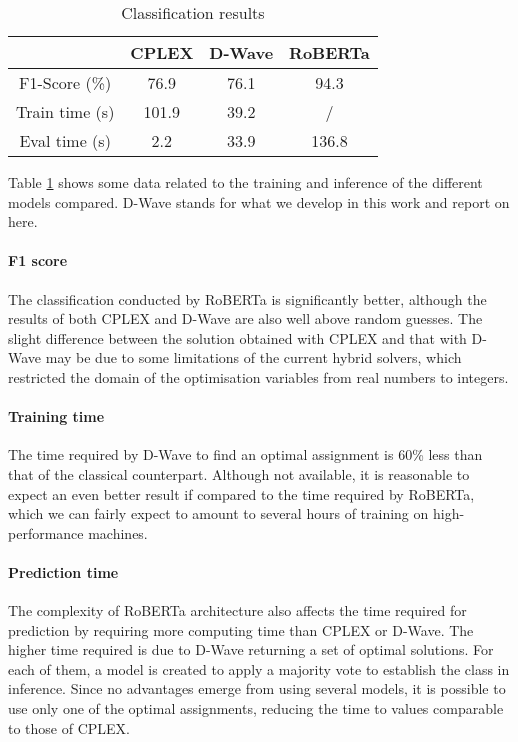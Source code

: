\documentclass{ceurart}
\begin{document}
\begin{table}
    \caption{Classification results}
    \label{tab:classification}
    \begin{tabular}{cccc}
        \toprule
        & CPLEX & D-Wave & RoBERTa \\
        \midrule
        F1-Score (\%) & 76.9 & 76.1 & 94.3 \\
        Train time (s) & 101.9 & 39.2 & / \\
        Eval time (s) & 2.2 & 33.9 & 136.8 \\
        \bottomrule
    \end{tabular}
\end{table}

Table \ref{tab:classification} shows some data related to the training and inference of the different models compared. D-Wave stands for what we develop in this work and report on here.

\paragraph{F1 score} The classification conducted by RoBERTa is significantly better, although the results of both CPLEX and D-Wave are also well above random guesses. The slight difference between the solution obtained with CPLEX and that with D-Wave may be due to some limitations of the current hybrid solvers, which restricted the domain of the optimisation variables from real numbers to integers.

\paragraph{Training time} The time required by D-Wave to find an optimal assignment is 60\% less than that of the classical counterpart. Although not available, it is reasonable to expect an even better result if compared to the time required by RoBERTa, which we can fairly expect to amount to several hours of training on high-performance machines.

\paragraph{Prediction time} The complexity of RoBERTa architecture also affects the time required for prediction by requiring more computing time than CPLEX or D-Wave. The higher time required is due to D-Wave returning a set of optimal solutions. For each of them, a model is created to apply a majority vote to establish the class in inference. Since no advantages emerge from using several models, it is possible to use only one of the optimal assignments, reducing the time to values comparable to those of CPLEX.
\end{document}
